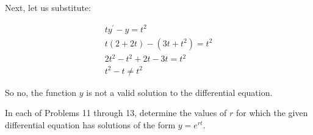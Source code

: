 \documentclass{lapchomework}
\begin{document}
\begin{problems}
\begin{solution}
\step Next, let us substitute:

\step \begin{gather*}
ty^{\prime}-y=t^2\\
t(2+2t) - (3t + t^2) = t^2\\
2t^2 - t^2 + 2t - 3t = t^2\\
\boxed{t^2 - t \neq t^2}
\end{gather*}

\step So no, the function $y$ is not a valid solution to the differential
equation.

\end{solution}

\end{problems}

\begin{instructions}
In each of Problems 11 through 13, determine the values of $r$ for which
the given differential equation has solutions of the form $y = e^{rt}$.
\end{instructions}
\end{document}
